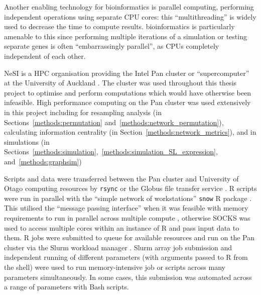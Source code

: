 Another enabling technology for \gls{bioinformatics} is parallel computing, performing independent operations using separate \gls{CPU} cores: this ``multithreading'' is widely used to \textcolor{black}{de}crease the time to compute results. \Gls{bioinformatics} is particularly amenable to this since performing multiple iterations of a simulation or testing separate genes is often ``embarrassingly parallel'', as \glspl{CPU} completely independent of each other. %

\Gls{NeSI} is a \gls{HPC} organisation providing the Intel Pan cluster or ``supercomputer'' at the University of Auckland \citep{NeSI}. The cluster was used throughout this thesis project to optimise and perform computations which would have otherwise been infeasible. High performance computing on the Pan cluster was used extensively in this project including for resampling analysis (in Sections~\ref{methods:permutation} and~\ref{methods:network_permutation}), calculating \gls{information centrality} (in Section~\ref{methods:network_metrics}), and in simulations (in Sections~\ref{methods:simulation},~\ref{methods:simulation_SL_expression}, and~\ref{methods:graphsim})

Scripts and data were transferred between the Pan cluster and University of Otago computing resources by \texttt{rsync} or the Globus file transfer service \citep{Globus}. R scripts \citep{R_core} were run in parallel with the ``simple network of workstations'' \texttt{snow} R package \citet{snow}. This utilised the ``message passing interface'' \citep{Rmpi} when it was feasible with memory requirements to run in parallel across multiple compute , otherwise \gls{SOCKS} was used to access multiple cores within an instance of R and pass input data to them. R jobs were submitted to queue for available resources and run on the Pan cluster via the \gls{Slurm} workload manager \citep{slurm}.  \gls{Slurm} array job submission and independent running of different parameters (with arguments passed to R from the shell) were used to run memory-intensive job or scripts across many parameters simultaneously. In some cases, this submission was automated across a range of parameters with Bash scripts.


